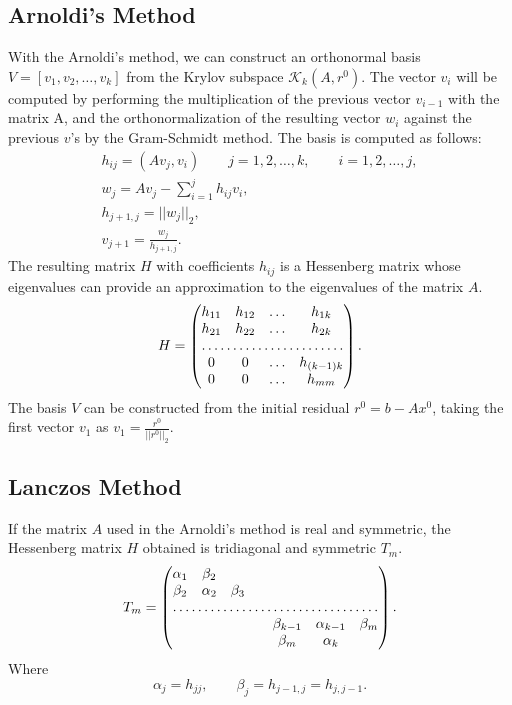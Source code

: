 \documentclass[12pt]{report}
\begin{document}
\subsection{Arnoldi's Method}
With the Arnoldi’s method, we can construct an orthonormal basis $V=[v_1,v_2,\dots, v_k]$ from the Krylov subspace $\mathcal{K}_k(A,r^0)$.
The vector $v_i$ will be computed by performing the multiplication of the previous vector $v_{i-1}$ with the matrix A, and the orthonormalization of the resulting vector $w_i$ against the previous $v$’s by the Gram-Schmidt method. The basis is computed as follows:
\begin{gather*}
h_{ij}=(Av_j,v_i)\qquad j=1,2,\dots, k,\qquad i=1,2,\dots,j,\\
w_j=Av_j-\sum_{i=1}^jh_{ij}v_i,\\
h_{j+1,j}=||w_j||_2,\\
v_{j+1}=\frac{w_j}{h_{j+1,j}}.
\end{gather*}
The resulting matrix $H$ with coefficients $h_{ij}$ is a Hessenberg matrix  whose eigenvalues can provide an approximation to the eigenvalues of the matrix $A$.
\begin{equation*}
H=
\begin{pmatrix}
h_{11} & h_{12} &\dots  & h_{1k} \\
h_{21} & h_{22} &\dots  & h_{2k} \\
\hdotsfor{4}\\
0  &0 &\dots  &h_{(k-1)k} \\
0   &0 &\dots & h_{mm}
\end{pmatrix}.
\end{equation*}
The basis $V$ can be constructed from the initial residual $r^0=b-Ax^0$, taking the first vector $v_1$ as
$v_1=\frac{r^0}{||r^0||_2}$.


\subsection{Lanczos Method}
If the matrix $A$ used in the Arnoldi's method is real and symmetric, the Hessenberg matrix $H$ obtained is tridiagonal and symmetric $T_m$.
\begin{equation*}
T_m=
\begin{pmatrix}
\alpha_{1} & \beta_{2}  \\
\beta_{2} & \alpha_{2} &\beta_3 \\
\hdotsfor{7}\\
 & & & &\beta_{k-1} &\alpha_{k-1} &\beta_m \\
 & & & &\beta_m & \alpha_{k}
\end{pmatrix}.
\end{equation*}
Where
\begin{equation*}
 \alpha_j=h_{jj}, \qquad \beta_j=h_{j-1,j}=h_{j,j-1}.  
\end{equation*}
\end{document}
